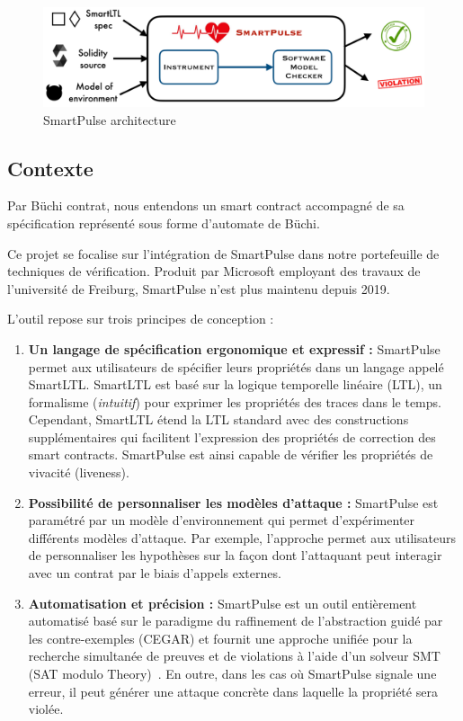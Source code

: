 \documentclass{article}
\begin{document}
\begin{figure}[h]
    \centering
    \includegraphics[scale=0.18]{smartpulse.png}
    \caption{SmartPulse architecture}
    \label{fig:smartpulse}
\end{figure}
\subsection{Contexte} 

Par Büchi contrat, nous entendons un smart contract accompagné de sa spécification représenté sous forme d'automate de Büchi.

Ce projet se focalise sur l'intégration de SmartPulse dans notre portefeuille de techniques de vérification. Produit par Microsoft employant des travaux de l'université de Freiburg, SmartPulse n'est plus maintenu depuis 2019.

L'outil repose sur trois principes de conception :

\begin{enumerate}
\item \textbf{Un langage de spécification ergonomique et expressif :} SmartPulse permet aux utilisateurs de spécifier leurs propriétés dans un langage appelé SmartLTL. SmartLTL est basé sur la logique temporelle linéaire (LTL), un formalisme (\textit{intuitif}) pour exprimer les propriétés des traces dans le temps. Cependant, SmartLTL étend la LTL standard avec des constructions supplémentaires qui facilitent l'expression des propriétés de correction des smart contracts. SmartPulse est ainsi capable de vérifier les propriétés de vivacité (liveness).


\item \textbf{Possibilité de personnaliser les modèles d'attaque :} SmartPulse est paramétré par un modèle d'environnement qui permet d'expérimenter différents modèles d'attaque. Par exemple, l'approche permet aux utilisateurs de personnaliser les hypothèses sur la façon dont l'attaquant peut interagir avec un contrat par le biais d'appels externes.

\item \textbf{Automatisation et précision :} SmartPulse est un outil entièrement automatisé basé sur le paradigme du raffinement de l'abstraction guidé par les contre-exemples (CEGAR) et fournit une approche unifiée pour la recherche simultanée de preuves et de violations à l'aide d'un solveur SMT (SAT modulo Theory)~\cite{BarFT-SMTLIB}. En outre, dans les cas où SmartPulse signale une erreur, il peut générer une attaque concrète dans laquelle la propriété sera violée. 

\end{enumerate}
\end{document}
